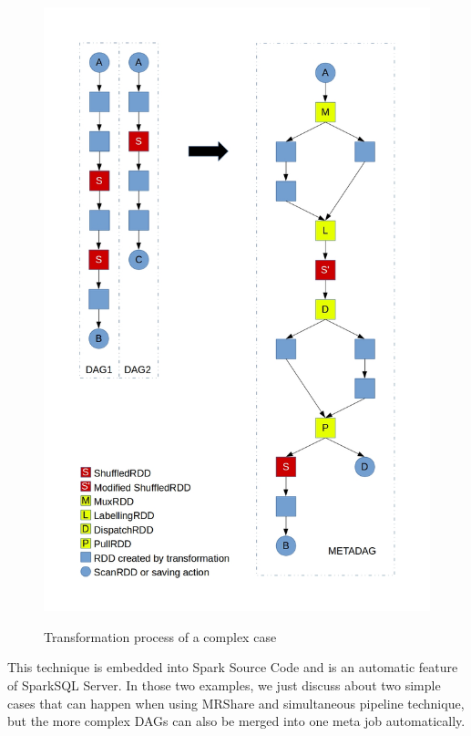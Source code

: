 \begin{itemize}
\begin{figure}
\includegraphics[width=\textwidth]{Figures/complexmetajob.jpg}
\label{fig:complexmetajob}
\caption{Transformation process of a complex case}
\end{figure}
\end{itemize}

This technique is embedded into Spark Source Code and is an automatic feature of SparkSQL Server. In those two examples, we just discuss about two simple cases that can happen when using MRShare and simultaneous pipeline technique, but the more complex DAGs can also be merged into one meta job automatically.